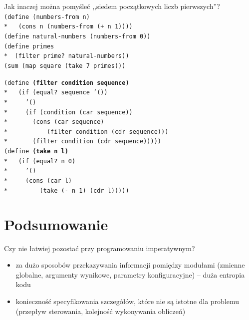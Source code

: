 \documentclass{beamer}
\begin{document}
\begin{frame}[fragile]
  Jak inaczej można pomyśleć ,,siedem początkowych liczb pierwszych''? \\ \pause
  \texttt{(define (numbers-from n)\\* \pause
    \ \ (cons n (numbers-from (+ n 1))))}\\ \pause
  \texttt{(define natural-numbers (numbers-from 0))} \\ \pause
  \texttt{(define primes\\*\ \  (filter prime?\ natural-numbers))} \\ \pause
  \texttt{(sum (map square (take 7 primes)))} \pause
\end{frame}

\begin{frame}
  \pause
  \texttt{(define \textbf{(filter condition sequence)} \\*
    \ \ (if (equal?\ sequence '()) \\*
    \ \ \ \ '()\\*
    \ \ \ \ (if (condition (car sequence))\\*
    \ \ \ \ \ \ (cons (car sequence)\\*
    \ \ \ \ \ \ \ \ \ \ (filter condition (cdr sequence)))\\*
    \ \ \ \ \ \ (filter condition (cdr sequence)))))} \\ \pause
  \texttt{(define \textbf{(take n l)}\\*
    \ \ (if (equal?\ n 0)\\*
    \ \ \ \ '()\\*
    \ \ \ \ (cons (car l)\\*
    \ \ \ \ \ \ \ \ (take (- n 1) (cdr l)))))}
\end{frame}

\section{Podsumowanie}

\begin{frame}
  Czy nie łatwiej pozostać przy programowaniu imperatywnym? \pause
  \begin{itemize}
  \item za dużo sposobów przekazywania informacji pomiędzy
    modułami (zmienne globalne, argumenty wynikowe, parametry
    konfiguracyjne) -- duża entropia kodu \pause
  \item konieczność specyfikowania szczegółów, które nie są
    istotne dla problemu (przepływ sterowania, kolejność
    wykonywania obliczeń)
  \end{itemize}
\end{frame}
\end{document}

